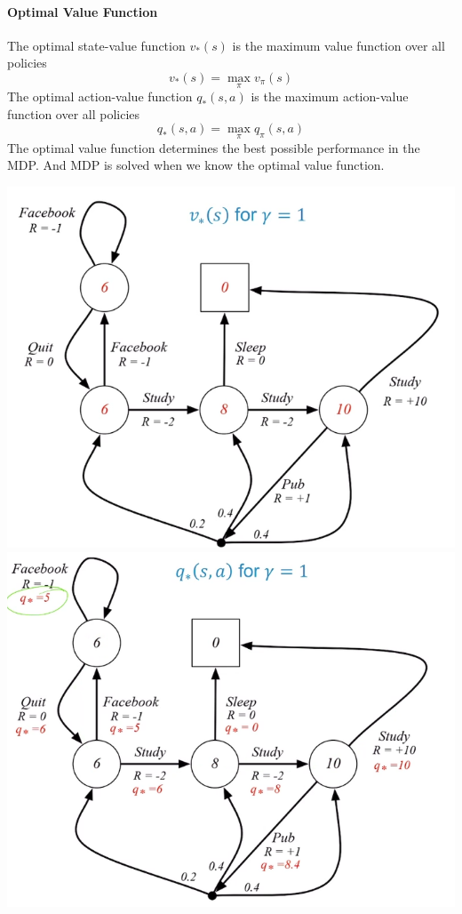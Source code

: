 \documentclass[10pt]{report}
\begin{document}
\paragraph{Optimal Value Function} The optimal state-value function $v_*(s)$ is the maximum value function over all policies $$v_*(s) = \max_\pi v_\pi(s)$$
The optimal action-value function $q_*(s,a)$ is the maximum action-value function over all policies $$q_*(s,a)=\max_\pi q_\pi(s,a)$$
The optimal value function determines the best possible performance in the MDP. And MDP is solved when we know the optimal value function.
\begin{center}
	\includegraphics[scale=0.5]{163.png}\\
	\includegraphics[scale=0.5]{164.png}
\end{center}
\end{document}
